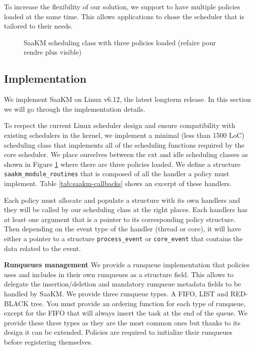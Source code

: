 To increase the flexibility of our solution, we support to have multiple policies loaded at the same time. This allows applications to chose the scheduler that is tailored to their needs.

\begin{figure}[htbp]
        \centering
        
        \caption{SaaKM scheduling class with three policies loaded (refaire pour rendre plus visible)}
        \label{fig:linux-saakm-sched-class}
\end{figure}

\subsection{Implementation}
We implement SaaKM on Linux v6.12, the latest longterm release. In this section we will go through the implementation details.

To respect the current Linux scheduler design and ensure compatibility with existing schedulers in the kernel, we implement a minimal (less than 1500 LoC) scheduling class that implements all of the scheduling functions required by the core scheduler. We place ourselves between the ext and idle scheduling classes as shown in Figure \ref{fig:linux-saakm-sched-class} where there are three policies loaded. We define a structure \texttt{saakm\_module\_routines} that is composed of all the handler a policy must implement. Table \ref{tab:saakm-callbacks} shows an excerpt of these handlers.

Each policy must allocate and populate a structure with its own handlers and they will be called by our scheduling class at the right places. Each handlers has at least one argument that is a pointer to its corresponding policy structure. Then depending on the event type of the handler (thread or core), it will have either a pointer to a structure \texttt{process\_event} or \texttt{core\_event} that contains the data related to the event.

\textbf{Runqueues management} We provide a runqueue implementation that policies uses and includes in their own runqueues as a structure field. This allows to delegate the insertion/deletion and mandatory runqueue metadata fields to be handled by SaaKM. We provide three runqueue types. A FIFO, LIST and RED-BLACK tree. You must provide an ordering function for each type of runqueue, except for the FIFO that will always insert the task at the end of the queue. We provide these three types as they are the most common ones but thanks to its design it can be extended. Policies are required to initialize their runqueues before registering themselves. 

